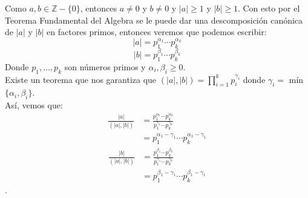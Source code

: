\documentclass[fontsize=12pt]{scrartcl}
\providecommand{\abs}[1]{\lvert#1\rvert}
\begin{document}
\begin{enumerate}
                  Como  $a, b \in \mathbb{Z}-\{0\}$, entonces $a \neq 0$ y $b \neq 0$ y $\abs{a} \geq 1$ y $\abs{b} \geq 1$. Con esto por el Teorema Fundamental del Algebra se le puede dar una descomposición canónica de $ \abs{a}$ y $\abs{b}$ en factores primos, entonces veremos que podemos escribir: \\
                  \[ \abs{a} = p_1^{\alpha_1} \cdots p_k^{\alpha_k} \]
                  \[ \abs{b} = p_1^{\beta_1} \cdots p_k^{\beta_k} \]
                  Donde $p_1, \dots ,p_k$ son números primos y $\alpha_i, \beta_i \geq 0$. \\

                  Existe un teorema que nos garantiza que $(\abs{a},\abs{b}) = \prod_{i=1}^{k} p_i ^{\gamma_i} $ donde $\gamma_i =$ mín$\{\alpha_i, \beta_i\}$. \\
                  Así, vemos que:
                   \begin{equation*}
                    \begin{split}
                      \frac{\abs {a} } {(\abs{a},\abs{b})} &= \frac{ p_1^{\alpha_1} \cdots p_k^{\alpha_k} } {p_1^{\gamma_1} \cdots p_k^{\gamma_k}}\\
                      &= p_1^{\alpha_1 - \gamma_1} \cdots p_k^{\alpha_1 - \gamma_1}
                    \end{split}
                  \end{equation*}
                    \begin{equation*}
                    \begin{split}
                      \frac{\abs {b} } {(\abs{a},\abs{b})} &= \frac{ p_1^{\beta_1} \cdots p_k^{\beta_k} } {p_1^{\gamma_1} \cdots p_k^{\gamma_k}}\\
                      &= p_1^{\beta_1 - \gamma_1} \cdots p_k^{\beta_1 - \gamma_1}
                    \end{split}
                    \end{equation*}.



\end{enumerate}
\end{document}
